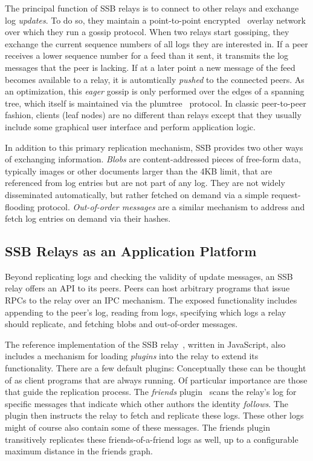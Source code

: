 \documentclass[10pt,sigconf,rewiew]{acmart}
\begin{document}
The principal function of SSB relays is to connect to other relays and exchange log {\em updates}. To do so, they maintain a point-to-point encrypted~\cite{tarr2015secrethandshake} overlay network over which they run a gossip protocol. When two relays start gossiping, they exchange the current sequence numbers of all logs they are interested in. If a peer receives a lower sequence number for a feed than it sent, it transmits the log messages that the peer is lacking. If at a later point a new message of the feed becomes available to a relay, it is automtically \textit{pushed} to the connected peers. As an optimization, this {\em eager} gossip is only performed over the edges of a spanning tree, which itself is maintained via the plumtree~\cite{leitao2007epidemic} protocol. In classic peer-to-peer fashion, clients (leaf nodes) are no different than relays except that they usually include some graphical user interface and perform application logic.

In addition to this primary replication mechanism, SSB provides two other ways of exchanging information. {\em Blobs} are content-addressed pieces of free-form data, typically images or other documents larger than the 4KB limit, that are referenced from log entries but are not part of any log. They are not widely disseminated automatically, but rather fetched on demand via a simple request-flooding protocol. {\em Out-of-order messages} are a similar mechanism to address and fetch log entries on demand via their hashes.

\subsection*{SSB Relays as an Application Platform}

Beyond replicating logs and checking the validity of update messages, an SSB relay offers an API to its peers. Peers can host arbitrary programs that issue RPCs to the relay over an IPC mechanism. The exposed functionality includes appending to the peer's log, reading from logs, specifying which logs a relay should replicate, and fetching blobs and out-of-order messages.

The reference implementation of the SSB relay~\cite{ssb-server}, written in JavaScript, also includes a mechanism for loading {\em plugins} into the relay to extend its functionality. There are a few default plugins: Conceptually these can be thought of as client programs that are always running. Of particular importance are those that guide the replication process. The {\em friends} plugin~\cite{ssb-friends} scans the relay's log for specific messages that indicate which other authors the identity {\em follows}. The plugin then instructs the relay to fetch and replicate these logs. These other logs might of course also contain some of these messages. The friends plugin transitively replicates these friends-of-a-friend logs as well, up to a configurable maximum distance in the friends graph.
\end{document}

